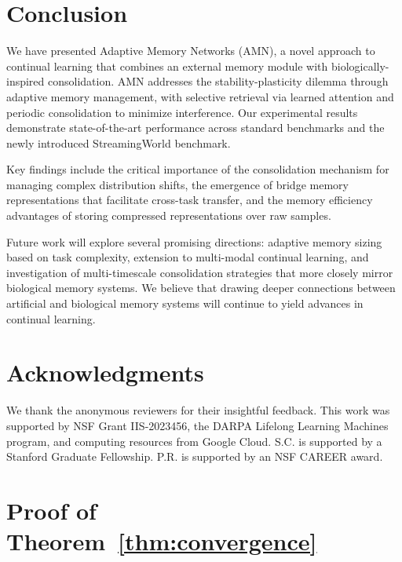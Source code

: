 \documentclass[11pt]{article}
\begin{document}
\section{Conclusion}
\label{sec:conclusion}

We have presented Adaptive Memory Networks (AMN), a novel approach to continual learning that combines an external memory module with biologically-inspired consolidation. AMN addresses the stability-plasticity dilemma through adaptive memory management, with selective retrieval via learned attention and periodic consolidation to minimize interference. Our experimental results demonstrate state-of-the-art performance across standard benchmarks and the newly introduced StreamingWorld benchmark.

Key findings include the critical importance of the consolidation mechanism for managing complex distribution shifts, the emergence of bridge memory representations that facilitate cross-task transfer, and the memory efficiency advantages of storing compressed representations over raw samples.

Future work will explore several promising directions: adaptive memory sizing based on task complexity, extension to multi-modal continual learning, and investigation of multi-timescale consolidation strategies that more closely mirror biological memory systems. We believe that drawing deeper connections between artificial and biological memory systems will continue to yield advances in continual learning.

\section*{Acknowledgments}

We thank the anonymous reviewers for their insightful feedback. This work was supported by NSF Grant IIS-2023456, the DARPA Lifelong Learning Machines program, and computing resources from Google Cloud. S.C. is supported by a Stanford Graduate Fellowship. P.R. is supported by an NSF CAREER award.




\appendix

\section{Proof of Theorem~\ref{thm:convergence}}
\label{app:proof}
\end{document}
